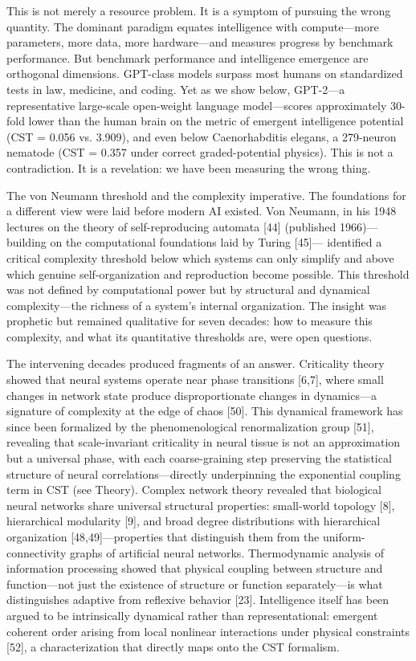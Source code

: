 \documentclass[a4paper,12pt]{article}
\begin{document}
This is not merely a resource problem. It is a symptom of pursuing the wrong quantity. The dominant paradigm equates intelligence with compute---more parameters, more data, more hardware---and measures progress by benchmark performance. But benchmark performance and intelligence emergence are orthogonal dimensions. GPT-class models surpass most humans on standardized tests in law, medicine, and coding. Yet as we show below, GPT-2---a representative large-scale open-weight language model---scores approximately 30-fold lower than the human brain on the metric of emergent intelligence potential (CST = 0.056 vs. 3.909), and even below Caenorhabditis elegans, a 279-neuron nematode (CST = 0.357 under correct graded-potential physics). This is not a contradiction. It is a revelation: we have been measuring the wrong thing.


The von Neumann threshold and the complexity imperative. The foundations for a different view were laid before modern AI existed. Von Neumann, in his 1948 lectures on the theory of self-reproducing automata [44] (published 1966)---building on the computational foundations laid by Turing [45]--- identified a critical complexity threshold below which systems can only simplify and above which genuine self-organization and reproduction become possible. This threshold was not defined by computational power but by structural and dynamical complexity---the richness of a system's internal organization. The insight was prophetic but remained qualitative for seven decades: how to measure this complexity, and what its quantitative thresholds are, were open questions.


The intervening decades produced fragments of an answer. Criticality theory showed that neural systems operate near phase transitions [6,7], where small changes in network state produce disproportionate changes in dynamics---a signature of complexity at the edge of chaos [50]. This dynamical framework has since been formalized by the phenomenological renormalization group [51], revealing that scale-invariant criticality in neural tissue is not an approximation but a universal phase, with each coarse-graining step preserving the statistical structure of neural correlations---directly underpinning the exponential coupling term in CST (see Theory). Complex network theory revealed that biological neural networks share universal structural properties: small-world topology [8], hierarchical modularity [9], and broad degree distributions with hierarchical organization [48,49]---properties that distinguish them from the uniform-connectivity graphs of artificial neural networks. Thermodynamic analysis of information processing showed that physical coupling between structure and function---not just the existence of structure or function separately---is what distinguishes adaptive from reflexive behavior [23]. Intelligence itself has been argued to be intrinsically dynamical rather than representational: emergent coherent order arising from local nonlinear interactions under physical constraints [52], a characterization that directly maps onto the CST formalism.
\end{document}
